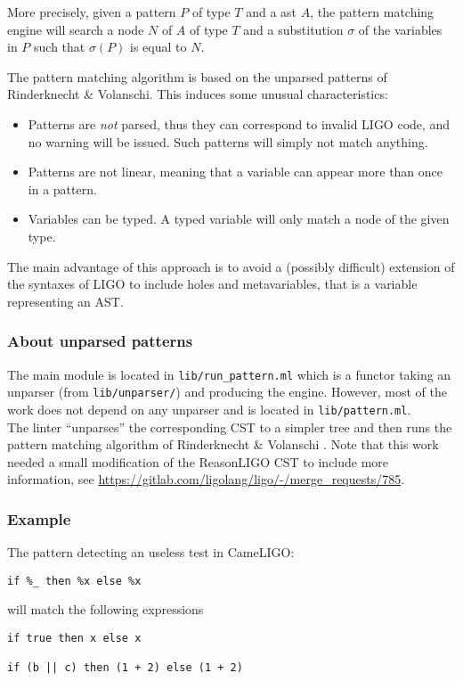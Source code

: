 \documentclass[10pt,a4paper]{article}
\begin{document}
More precisely, given a pattern $P$ of type $T$ and a ast $A$, the pattern matching engine will search a node $N$ of $A$ of type $T$ and a substitution $\sigma$ of the variables in $P$ such that $\sigma(P)$ is equal to $N$.

The pattern matching algorithm is based on the unparsed patterns of Rinderknecht \& Volanschi\cite{unparsedpatterns}. This induces some unusual characteristics:

\begin{itemize}
\item Patterns are \emph{not} parsed, thus they can correspond to invalid LIGO code, and no warning will be issued. Such patterns will simply not match anything.
\item Patterns are not linear, meaning that a variable can appear more than once in a pattern.
\item Variables can be typed. A typed variable will only match a node of the given type.
\end{itemize}

The main advantage of this approach is to avoid a (possibly difficult) extension of the syntaxes of LIGO to include holes and metavariables, that is a variable representing an AST.

\subsubsection{About unparsed patterns}
The main module is located in \verb|lib/run_pattern.ml| which is a functor taking an unparser (from \verb|lib/unparser/|) and producing the engine. However, most of the work does not depend on any unparser and is located in \verb|lib/pattern.ml|.\\
The linter ``unparses'' the corresponding CST to a simpler tree and then runs the pattern matching algorithm of Rinderknecht \& Volanschi \cite{unparsedpatterns}.
Note that this work needed a small modification of the ReasonLIGO CST to include more information, see \url{https://gitlab.com/ligolang/ligo/-/merge_requests/785}.

\subsubsection{Example}
The pattern detecting an useless test in CameLIGO:
\begin{verbatim}
if %_ then %x else %x
\end{verbatim}

will match the following expressions
\begin{verbatim}
if true then x else x

if (b || c) then (1 + 2) else (1 + 2)
\end{verbatim}
\end{document}
